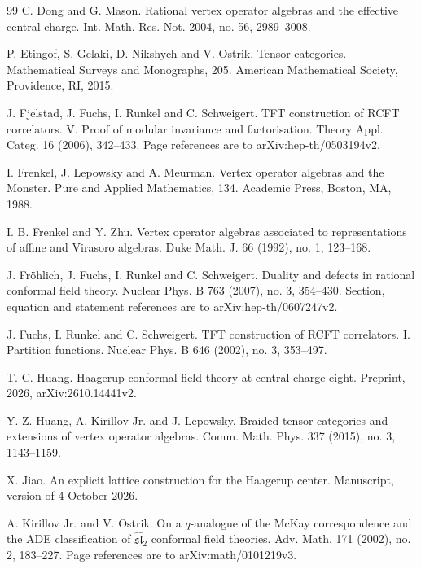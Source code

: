 \documentclass[leqno]{article}
\numberwithin{equation}{section}
\begin{document}
\begin{thebibliography}{99}
C. Dong and G. Mason.
\newblock Rational vertex operator algebras and the effective central charge.
\newblock Int. Math. Res. Not. 2004, no. 56, 2989--3008.

P. Etingof, S. Gelaki, D. Nikshych and V. Ostrik.
\newblock Tensor categories.
\newblock Mathematical Surveys and Monographs, 205. American Mathematical Society, Providence, RI, 2015.

J. Fjelstad, J. Fuchs, I. Runkel and C. Schweigert.
\newblock TFT construction of RCFT correlators. V. Proof of modular invariance and factorisation.
\newblock Theory Appl. Categ. 16 (2006), 342--433. Page references are to arXiv:hep-th/0503194v2.

I. Frenkel, J. Lepowsky and A. Meurman.
\newblock Vertex operator algebras and the Monster.
\newblock Pure and Applied Mathematics, 134. Academic Press, Boston, MA, 1988.

I. B. Frenkel and Y. Zhu.
\newblock Vertex operator algebras associated to representations of affine and Virasoro algebras.
\newblock Duke Math. J. 66 (1992), no. 1, 123--168.

J. Fröhlich, J. Fuchs, I. Runkel and C. Schweigert.
\newblock Duality and defects in rational conformal field theory.
\newblock Nuclear Phys. B 763 (2007), no. 3, 354--430. Section, equation and statement references are to arXiv:hep-th/0607247v2.

J. Fuchs, I. Runkel and C. Schweigert.
\newblock TFT construction of RCFT correlators. I. Partition functions.
\newblock Nuclear Phys. B 646 (2002), no. 3, 353--497.

T.-C. Huang.
\newblock Haagerup conformal field theory at central charge eight.
\newblock Preprint, 2026, arXiv:2610.14441v2.

Y.-Z. Huang, A. Kirillov Jr. and J. Lepowsky.
\newblock Braided tensor categories and extensions of vertex operator algebras.
\newblock Comm. Math. Phys. 337 (2015), no. 3, 1143--1159.

X. Jiao.
\newblock An explicit lattice construction for the Haagerup center.
\newblock Manuscript, version of 4 October 2026.

A. Kirillov Jr. and V. Ostrik.
\newblock On a $q$-analogue of the McKay correspondence and the ADE classification of $\widehat{\mathfrak{sl}}_2$ conformal field theories.
\newblock Adv. Math. 171 (2002), no. 2, 183--227. Page references are to arXiv:math/0101219v3.


\end{thebibliography}
\end{document}
